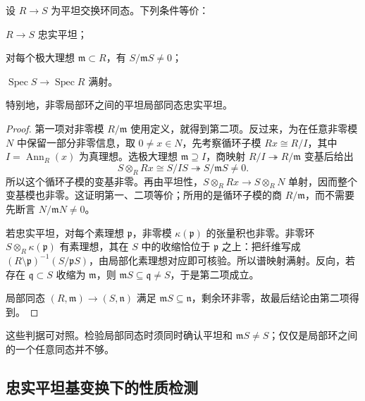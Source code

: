 \begin{theorem}\label{b3:thm:faithfully-flat-criterion}
	设 \(R\to S\) 为平坦交换环同态。下列条件等价：
	\begin{equivalences}
		\item \(R\to S\) 忠实平坦；
		\item 对每个极大理想 \(\mathfrak m\subset R\)，有 \(S/\mathfrak mS\ne0\)；
		\item \(\operatorname{Spec}S\to\operatorname{Spec}R\) 满射。
	\end{equivalences}
	特别地，非零局部环之间的平坦局部同态忠实平坦。
\end{theorem}
\begin{proof}
	第一项对非零模 \(R/\mathfrak m\) 使用定义，就得到第二项。反过来，为在任意非零模 \(N\) 中保留一部分非零信息，取 \(0\ne x\in N\)，先考察循环子模 \(Rx\cong R/I\)，其中 \(I=\operatorname{Ann}_R(x)\) 为真理想。选极大理想 \(\mathfrak m\supseteq I\)，商映射 \(R/I\twoheadrightarrow R/\mathfrak m\) 变基后给出
	\[
		S\otimes_RRx\cong S/IS\twoheadrightarrow S/\mathfrak mS\ne0.
	\]
	所以这个循环子模的变基非零。再由平坦性，\(S\otimes_RRx\to S\otimes_RN\) 单射，因而整个变基模也非零。这证明第一、二项等价；所用的是循环子模的商 \(R/\mathfrak m\)，而不需要先断言 \(N/\mathfrak mN\ne0\)。

	若忠实平坦，对每个素理想 \(\mathfrak p\)，非零模 \(\kappa(\mathfrak p)\) 的张量积也非零。非零环 \(S\otimes_R\kappa(\mathfrak p)\) 有素理想，其在 \(S\) 中的收缩恰位于 \(\mathfrak p\) 之上：把纤维写成 \((R\setminus\mathfrak p)^{-1}(S/\mathfrak pS)\)，由局部化素理想对应即可核验。所以谱映射满射。反向，若存在 \(\mathfrak q\subset S\) 收缩为 \(\mathfrak m\)，则 \(\mathfrak mS\subseteq\mathfrak q\ne S\)，于是第二项成立。

	局部同态 \((R,\mathfrak m)\to(S,\mathfrak n)\) 满足 \(\mathfrak mS\subseteq\mathfrak n\)，剩余环非零，故最后结论由第二项得到。
\end{proof}

这些判据可对照\cite[\S7, Theorems 7.2--7.3, pp. 47--48]{Matsumura1989CommutativeRingTheory}。检验局部同态时须同时确认平坦和 \(\mathfrak mS\ne S\)；仅仅是局部环之间的一个任意同态并不够。

\subsection{忠实平坦基变换下的性质检测}
\label{b3:subsec:1205:02}

